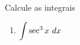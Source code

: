 \begin{frame}
	\begin{casa}
Calcule as integrais
\begin{enumerate}

\item $\dps \int \sec^3 x\ dx$
\end{enumerate}

\end{casa}



\end{frame}


%
%
%
%
%
%
%
%
%
%
%
%

